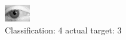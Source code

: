 \begin{figure}[h!]
\begin{center}
\includegraphics[width=0.60\columnwidth]{figures/ID2799_class_4_target_3.png}
\end{center}
\caption{ Classification: 4 actual target: 3}
\label{fig:ID2799_class_4_target_3}
\end{figure}
